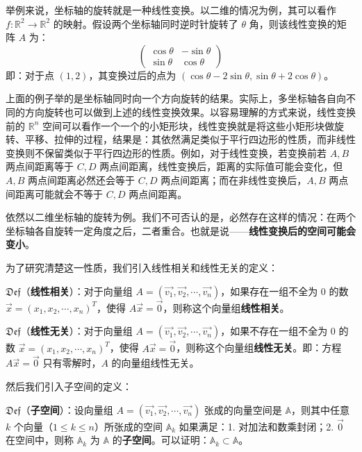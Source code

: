 \documentclass[b5paper]{ctexart}
\newcommand{\R}{\mathbb{R}}
\newcommand \ding[2]{$\mathfrak{Def}$（\textbf{#1}）：#2}
\begin{document}
	 举例来说，坐标轴的旋转就是一种线性变换。以二维的情况为例，其可以看作 $f: \R^2 \to \R^2$ 的映射。假设两个坐标轴同时逆时针旋转了 $\theta$ 角，则该线性变换的矩阵 $A$ 为：
	 \[
	 \begin{pmatrix}
	 	\cos \theta & -\sin \theta \\
	 	\sin \theta & \cos \theta
	 \end{pmatrix}
	 \]
	即：对于点 $(1, 2)$，其变换过后的点为 $(\cos \theta - 2 \sin \theta, \sin \theta + 2 \cos \theta)$。
	
	上面的例子举的是坐标轴同时向一个方向旋转的结果。实际上，多坐标轴各自向不同的方向旋转也可以做到上述的线性变换效果。以容易理解的方式来说，线性变换前的 $\R^n$ 空间可以看作一个一个的小矩形块，线性变换就是将这些小矩形块做旋转、平移、拉伸的过程，结果是：其依然满足类似于平行四边形的性质，而非线性变换则不保留类似于平行四边形的性质。例如，对于线性变换，若变换前若 $A, B$ 两点间距离等于 $C, D$ 两点间距离，线性变换后，距离的实际值可能会变化，但$A, B$ 两点间距离必然还会等于 $C, D$ 两点间距离；而在非线性变换后，$A, B$ 两点间距离可能就会不等于 $C, D$ 两点间距离。
	
	依然以二维坐标轴的旋转为例。我们不可否认的是，必然存在这样的情况：在两个坐标轴各自旋转一定角度之后，二者重合。也就是说——\textbf{线性变换后的空间可能会变小}。
	
	为了研究清楚这一性质，我们引入线性相关和线性无关的定义：
	
	\vspace{12pt}
	
	\ding{线性相关}{对于向量组 $A = (\vec{v_1}, \vec{v_2}, \cdots, \vec{v_n})$，如果存在一组不全为 $0$ 的数 $\vec{x} = (x_1, x_2, \cdots, x_n)^T$，使得 $A\vec{x} = \vec{0}$，则称这个向量组\textbf{线性相关}。}
		
	\ding{线性无关}{对于向量组 $A = (\vec{v_1}, \vec{v_2}, \cdots, \vec{v_n})$，如果不存在一组不全为 $0$ 的数 $\vec{x} = (x_1, x_2, \cdots, x_n)^T$，使得 $A\vec{x} = \vec{0}$，则称这个向量组\textbf{线性无关}。即：方程 $A\vec{x} = \vec{0}$ 只有零解时，$A$ 的向量组线性无关。}
	
	\vspace{12pt}
	
	然后我们引入子空间的定义：
	
	\vspace{12pt}
	
	\ding{子空间}{设向量组 $A = (\vec{v_1}, \vec{v_2}, \cdots, \vec{v_n})$ 张成的向量空间是 $\mathbb{A}$，则其中任意 $k$ 个向量（$1 \le k \le n$）所张成的空间 $\mathbb{A}_k$  如果满足：1. 对加法和数乘封闭；2. $\vec{0}$ 在空间中，则称 $\mathbb{A}_k$ 为 $\mathbb{A}$ 的\textbf{子空间}。可以证明：$\mathbb{A}_k \subset \mathbb{A}$。}
	
\end{document}
